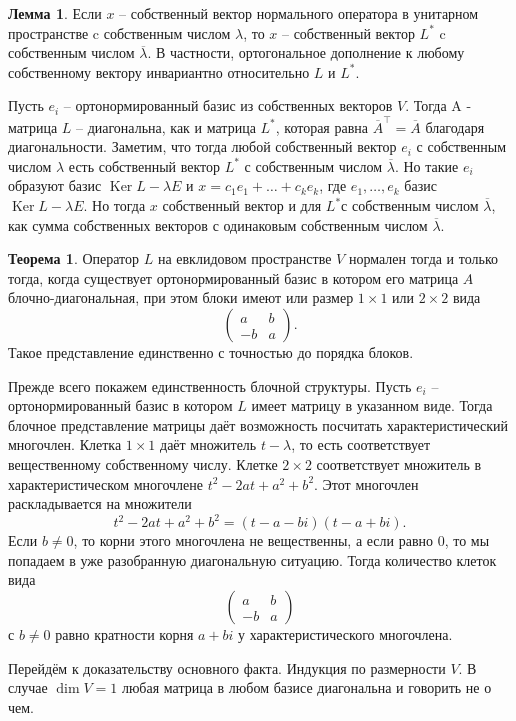 \documentclass[10pt,a4paper,oneside]{book}
\theoremstyle{definition}
\newtheorem{thm}{Теорема}
\newtheorem{lem}{Лемма}
\newcommand{\ovl}{\overline}
\DeclareMathOperator{\Ker}{Ker}
\def\thrm{\begin{thm}}
\def\ethrm{\end{thm}}
\def\lm{\begin{lem}}
\def\elm{\end{lem}}
\begin{document}
\lm Если $x$ -- собственный вектор нормального оператора в унитарном пространстве c собственным числом $\lambda$, то $x$ -- собственный вектор $L^*$ c собственным числом $\ovl{\lambda}$. В частности, ортогональное дополнение к любому собственному вектору инвариантно относительно $L$ и $L^*$.
\elm
\proof Пусть $e_i$ -- ортонормированный базис из собственных векторов $V$. Тогда A - матрица $L$ -- диагональна, как и матрица $L^*$, которая равна $\ovl{A}^{\top}= \ovl{A}$ благодаря диагональности. Заметим, что тогда любой собственный вектор $e_i$ с собственным числом $\lambda$ есть собственный вектор $L^*$ с собственным числом $\ovl{\lambda}$.
Но такие $e_i$ образуют базис $\Ker L- \lambda E$ и
$x=c_1 e_1+\dots +c_k e_k$, где $e_1,\dots, e_k$ базис $\Ker L- \lambda E$. Но тогда $x$ собственный вектор и для $L^*$с собственным числом $\ovl{\lambda}$, как сумма собственных векторов с одинаковым собственным числом $\ovl{\lambda}$.
\endproof


\thrm
Оператор $L$ на евклидовом пространстве $V$ нормален  тогда и только тогда, когда существует ортонормированный базис в котором его матрица $A$ блочно-диагональная, при этом блоки имеют  или размер $1\times 1$ или $2\times 2$ вида
$$\begin{pmatrix}
a  & b\\
-b & a
\end{pmatrix}.$$
Такое представление единственно с точностью до порядка блоков.
\ethrm
\proof
Прежде всего покажем единственность блочной структуры. Пусть $e_i$ -- ортонормированный базис в котором $L$ имеет матрицу в указанном виде. Тогда блочное представление матрицы даёт возможность посчитать характеристический многочлен. Клетка $1\times 1$ даёт множитель $t-\lambda$, то есть соответствует вещественному собственному числу. Клетке $2\times 2$ соответствует множитель в характеристическом многочлене $t^2-2at+a^2+b^2$. Этот многочлен раскладывается на множители $$t^2-2at+a^2+b^2= (t-a-bi)(t-a+bi).$$
Если $b\neq 0$, то корни этого многочлена не вещественны, а если равно 0, то мы попадаем в уже разобранную диагональную ситуацию. Тогда количество клеток вида 
$$\begin{pmatrix}
a  & b\\
-b & a
\end{pmatrix}$$
с $b\neq 0$ равно кратности корня $a+bi$ у характеристического многочлена.



Перейдём к доказательству основного факта. Индукция по размерности $V$. В случае $\dim V=1$ любая матрица в любом базисе диагональна и говорить не о чем. 
\end{document}
